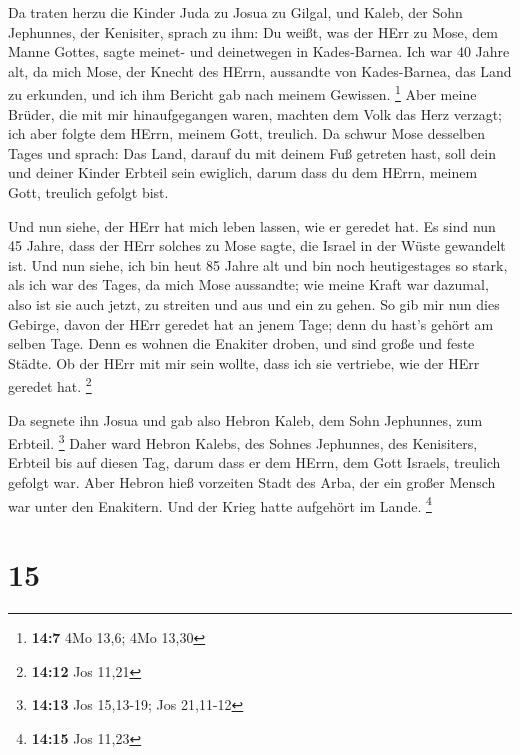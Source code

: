  Da traten herzu die Kinder Juda zu Josua zu Gilgal, und
Kaleb, der Sohn Jephunnes, der Kenisiter, sprach zu ihm: Du weißt, was
der HErr zu Mose, dem Manne Gottes, sagte meinet- und deinetwegen in
Kades-Barnea.  Ich war 40 Jahre alt, da mich Mose, der
Knecht des HErrn, aussandte von Kades-Barnea, das Land zu erkunden, und
ich ihm Bericht gab nach meinem Gewissen. \footnote{\textbf{14:7} 4Mo
  13,6; 4Mo 13,30}  Aber meine Brüder, die mit mir
hinaufgegangen waren, machten dem Volk das Herz verzagt; ich aber folgte
dem HErrn, meinem Gott, treulich.  Da schwur Mose desselben
Tages und sprach: Das Land, darauf du mit deinem Fuß getreten hast, soll
dein und deiner Kinder Erbteil sein ewiglich, darum dass du dem HErrn,
meinem Gott, treulich gefolgt bist.

 Und nun siehe, der HErr hat mich leben lassen, wie er
geredet hat. Es sind nun 45 Jahre, dass der HErr solches zu Mose sagte,
die Israel in der Wüste gewandelt ist. Und nun siehe, ich bin heut 85
Jahre alt  und bin noch heutigestages so stark, als ich war
des Tages, da mich Mose aussandte; wie meine Kraft war dazumal, also ist
sie auch jetzt, zu streiten und aus und ein zu gehen.  So
gib mir nun dies Gebirge, davon der HErr geredet hat an jenem Tage; denn
du hast's gehört am selben Tage. Denn es wohnen die Enakiter droben, und
sind große und feste Städte. Ob der HErr mit mir sein wollte, dass ich
sie vertriebe, wie der HErr geredet hat. \footnote{\textbf{14:12} Jos
  11,21}

 Da segnete ihn Josua und gab also Hebron Kaleb, dem Sohn
Jephunnes, zum Erbteil. \footnote{\textbf{14:13} Jos 15,13-19; Jos
  21,11-12}  Daher ward Hebron Kalebs, des Sohnes
Jephunnes, des Kenisiters, Erbteil bis auf diesen Tag, darum dass er dem
HErrn, dem Gott Israels, treulich gefolgt war.  Aber Hebron
hieß vorzeiten Stadt des Arba, der ein großer Mensch war unter den
Enakitern. Und der Krieg hatte aufgehört im Lande. \footnote{\textbf{14:15}
  Jos 11,23}

\hypertarget{section-6}{%
\section{15}\label{section-6}}


